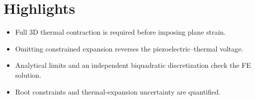 \documentclass[a4paper,11pt]{article}
\begin{document}
\section*{Highlights}
\begin{itemize}
\item Full 3D thermal contraction is required before imposing plane strain.
\item Omitting constrained expansion reverses the piezoelectric--thermal voltage.
\item Analytical limits and an independent biquadratic discretization check the FE solution.
\item Root constraints and thermal-expansion uncertainty are quantified.
\end{itemize}
\end{document}
